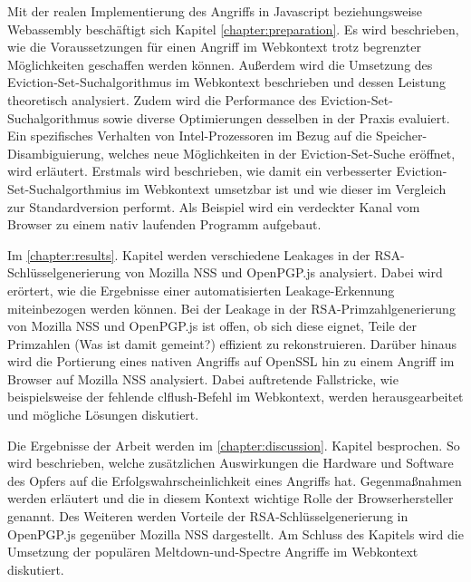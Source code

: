 \par \medskip                     

Mit der realen Implementierung des Angriffs in Javascript beziehungsweise Webassembly beschäftigt sich Kapitel \ref{chapter:preparation}.
Es wird beschrieben, wie die Voraussetzungen für einen Angriff im Webkontext trotz begrenzter Möglichkeiten geschaffen werden können.
Außerdem wird die Umsetzung des Eviction-Set-Suchalgorithmus im Webkontext beschrieben und dessen Leistung theoretisch analysiert.
Zudem wird die Performance des Eviction-Set-Suchalgorithmus sowie diverse Optimierungen desselben in der Praxis evaluiert.
Ein spezifisches Verhalten von Intel-Prozessoren im Bezug auf die Speicher-Disambiguierung, welches neue Möglichkeiten in der Eviction-Set-Suche eröffnet, wird erläutert.
Erstmals wird beschrieben, wie damit ein verbesserter Eviction-Set-Suchalgorthmius im Webkontext umsetzbar ist und wie dieser im Vergleich zur Standardversion performt.
Als Beispiel wird ein verdeckter Kanal vom Browser zu einem nativ laufenden Programm aufgebaut.

\par \medskip                      

Im \ref{chapter:results}. Kapitel werden verschiedene Leakages in der RSA-Schlüsselgenerierung von Mozilla NSS und OpenPGP.js analysiert.
Dabei wird erörtert, wie die Ergebnisse einer automatisierten Leakage-Erkennung miteinbezogen werden können.
Bei der Leakage in der RSA-Primzahlgenerierung von Mozilla NSS und OpenPGP.js ist offen, ob sich diese eignet, Teile der Primzahlen (Was ist damit gemeint?) effizient zu rekonstruieren.
Darüber hinaus wird die Portierung eines nativen Angriffs auf OpenSSL hin zu einem Angriff im Browser auf Mozilla NSS analysiert.
Dabei auftretende Fallstricke, wie beispielsweise der fehlende clflush-Befehl im Webkontext, werden herausgearbeitet und mögliche Lösungen diskutiert.

\par \medskip                       

Die Ergebnisse der Arbeit werden im \ref{chapter:discussion}. Kapitel besprochen.
So wird beschrieben, welche zusätzlichen Auswirkungen die Hardware und Software des Opfers auf die Erfolgswahrscheinlichkeit eines Angriffs hat.
Gegenmaßnahmen werden erläutert und die in diesem Kontext wichtige Rolle der Browserhersteller genannt.
Des Weiteren werden Vorteile der RSA-Schlüsselgenerierung in OpenPGP.js gegenüber Mozilla NSS dargestellt.
Am Schluss des Kapitels wird die Umsetzung der populären Meltdown-und-Spectre Angriffe im Webkontext diskutiert.

